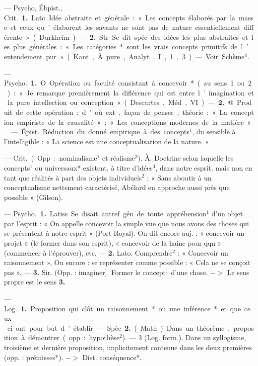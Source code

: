 \begin{itemize}[leftmargin=1cm, label=, itemsep=11pt]
 — \si{Psycho, Ébpist., Crit.} {\bf 1.}
Lato. Idée abstraite et générale :
« Les concepts élaborés par la masse
et ceux qu’élaborent les savants ne
sont pas de nature essentiellement
différente » (Durkheim). — {\bf 2.} Str.
Se dit spéc. des idées les plus
abstraites et les plus générales :
« Les catégories* sont les vrais
concepts primitifs de l’entendement
pur» (Kant, À. pure, Analyt., I, 1, 3).
— Voir Schème$^4$.

 — \si{Psycho.} {\bf 1.} O. Opération ou faculté consistant à concevoir* (au sens 1 ou 2) : « Je remarque
premièrement la diflérence qui est
entre l'imagination et la pure intellection ou conception » (Descartes,
Méd., VI). — {\bf 2.} @. Produit de cette
opération; d’où ext., façon de penser,
théorie : « La conception empiriste
de la causalité »; « Les conceptions
modernes de la matière ».

 — \si{Épist.} Réduction
du donné empirique à des concepts$^1$,
du sensible à l'intelligible : « La
science est une conceptualisation de
la nature. »

 — \si{Crit.} (Opp. : nominalisme$^1$ et réalisme$^3$). À. Doctrine
selon laquelle les concepts$^1$ ou universaux* existent, à titre d'idées$^3$,
dans notre esprit, mais non en tant
que réalités à part des objets individuels$^2$ : « Sans aboutir à un conceptualisme nettement caractérisé, Abélard en approche aussi près que possible » (Gilson).

 — \si{Psycho.} {\bf 1.} Latiss. Se
disait autref. gén. de toute appréhension$^1$ d’un objet par l'esprit : « On
appelle concevoir la simple vue que
nous avons des choses qui se présentent
à notre esprit » (Port-Royal).
On dit encore auj. : « concevoir un
projet » (le former dans son esprit),
« concevoir de la haine pour qqn »
(commencer à l’éprouver), etc. —
{\bf 2.} Lato. Comprendre$^2$ : « Concevoir
un raisonnement », Ou encore : se
représenter comme possible : « Cela
ne se conçoit pas ». —  {\bf 3.} Sir. (Opp. :
imaginer]. Former le concept$^1$ d’une
chose. $->$ Le sens propre est le
sens {\bf 3.}

 — \si{Log.} {\bf 1.} Proposition
qui clôt un raisonnement* ou une
inférence* et que ceux-ci ont pour
but d'établir. — Spéc. {\bf 2.} (Math)
Dans un théorème, proposition à
démontrer (opp. : hypothèse$^2$). —
3 (Log. form.). Dans un syllogisme, troisième et dernière proposition, implicitement contenue dans
les deux premières (opp. : prémisses*). $->$ Dist. conséquence*.


\end{itemize}
